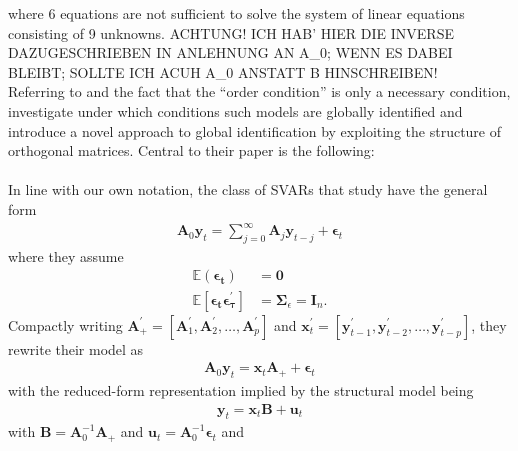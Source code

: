 \documentclass[a4paper,11pt,listof=nochaptergap,oneside,pointednumbers,bibtotoc,bigheadings,liststotoc]{scrbook}
\theoremstyle{mysatz}
\theoremstyle{mydefinition}
\theoremstyle{mybemerkung}
\newcommand{\vect}[1]{\boldsymbol{\mathbf{#1}}}
\begin{document}
\begin{itemize}
{		where 6 equations are not sufficient to solve the system of linear equations consisting of 9 unknowns. ACHTUNG! ICH HAB' HIER DIE INVERSE DAZUGESCHRIEBEN IN ANLEHNUNG AN A_0; WENN ES DABEI BLEIBT; SOLLTE ICH ACUH A_0 ANSTATT B HINSCHREIBEN!}\\
Referring to \citet{rothenberg:71} and the fact that the ``order condition'' is only a necessary condition, \citet{rubioetal:10} investigate under which conditions such models are globally identified and introduce a novel approach to global identification by exploiting the structure of orthogonal matrices. Central to their paper is the following: \\
\\
In line with our own notation, the class of SVARs that \citet{rubioetal:10} study have the general form
\begin{equation} \label{eq:svar_1}
\begin{split}
	\vect{A}_0 \vect{y}_t = \sum\limits_{j=0}^\infty \vect{A}_j\vect{y}_{t-j} + \vect{\epsilon}_t
\end{split}								
\end{equation}
where they assume 
\begin{equation}\label{eq:svar_2}
\begin{split}
	\mathbb{E}(\vect{\epsilon_t}) &  = \vect{0}  \\
	\mathbb{E}[\vect{\epsilon_t}\vect{\epsilon_{\tau}^'}] & = \vect{\Sigma}_\epsilon = \vect{I}_n.
\end{split}								
\end{equation}
Compactly writing $\vect{A}_{+}^' = [\vect{A}_1^', \vect{A}_2^', \dots, \vect{A}_p^']$ and $\vect{x}_{t}^' = [\vect{y}_{t-1}^', \vect{y}_{t-2}^', \dots, \vect{y}_{t-p}^']$, they rewrite their model as
\begin{equation}\label{eq:svar_3}
\begin{split}
	\vect{A}_0 \vect{y}_t =  \vect{x}_t \vect{A}_+ + \vect{\epsilon}_t
\end{split}								
\end{equation}
with the reduced-form representation implied by the structural model being
\begin{equation}\label{eq:svar_4}
\begin{split}
	 \vect{y}_t =  \vect{x}_t \vect{B} + \vect{u}_t
\end{split}								
\end{equation}
with $\vect{B} = \vect{A}_0^{-1}\vect{A}_+$ and $\vect{u}_t = \vect{A}_0^{-1}\vect{\epsilon}_t$ and
	\begin{equation} \label{eq:svar_5}

\end{equation}
\end{itemize}
\end{document}

